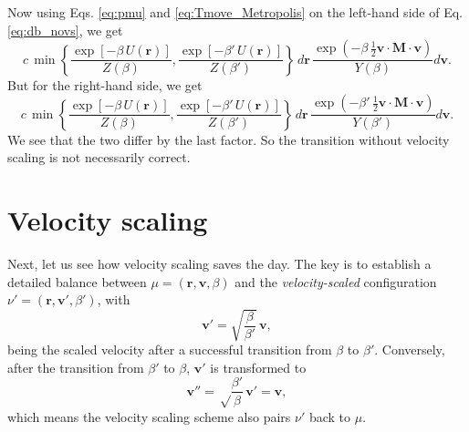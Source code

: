 \documentclass[11pt]{article}
\begin{document}
Now using Eqs. \eqref{eq:pmu} and \eqref{eq:Tmove_Metropolis}
on the left-hand side of Eq. \eqref{eq:db_novs}, we get
%
\begin{equation}
  c \,
  \min\left\{
    \frac{
      \exp\left[ -\beta \, U(\mathbf r) \right]
    }
    {
      Z(\beta)
    }
    ,
    \frac{
      \exp\left[ -\beta' \, U(\mathbf r) \right]
    }
    {
      Z(\beta')
    }
  \right\}
  \, d \mathbf r \,
  \frac{
    \exp\left(
      -\beta \, \frac{1}{2} \mathbf v \cdot \mathbf M \cdot \mathbf v
    \right)
  }
  {
    Y(\beta)
  }
  d \mathbf v
  .
\label{eq:pflow_left}
\end{equation}
%
But for the right-hand side, we get
%
\begin{equation}
  c \,
  \min\left\{
    \frac{
      \exp\left[ -\beta \, U(\mathbf r) \right]
    }
    {
      Z(\beta)
    }
    ,
    \frac{
      \exp\left[ -\beta' \, U(\mathbf r) \right]
    }
    {
      Z(\beta')
    }
  \right\}
  \, d \mathbf r \,
  \frac{
    \exp\left(
      -\beta' \, \frac{1}{2} \mathbf v \cdot \mathbf M \cdot \mathbf v
    \right)
  }
  {
    Y(\beta')
  }
  d \mathbf v
  .
\label{eq:pflow_left}
\end{equation}
%
We see that the two differ by the last factor.
%
So the transition without velocity scaling is
not necessarily correct.


\section{Velocity scaling}

Next, let us see how velocity scaling saves the day.
%
The key is to establish a detailed balance
between $\mu = (\mathbf r, \mathbf v, \beta)$
and the \emph{velocity-scaled} configuration
$\nu' = (\mathbf r, \mathbf v', \beta')$,
with
%
\begin{equation}
  \mathbf v'
  =
  \sqrt{ \frac{ \beta } { \beta' } }
  \, \mathbf v
  ,
\label{eq:vscale}
\end{equation}
%
being the scaled velocity after a successful transition
from $\beta$ to $\beta'$.
%
Conversely,
after the transition from $\beta'$ to $\beta$,
$\mathbf v'$ is transformed to
%
$$
  \mathbf v''
  =
  \sqrt \frac{ \beta' } { \beta } \,
  \mathbf v'
  =
  \mathbf v,
$$
which means the velocity scaling scheme also pairs
$\nu'$ back to $\mu$.
\end{document}
